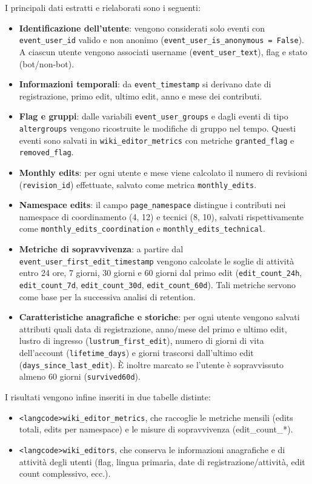 I principali dati estratti e rielaborati sono i seguenti:

\begin{itemize}
  \item \textbf{Identificazione dell’utente}: vengono considerati solo eventi con \texttt{event\_user\_id} valido e non anonimo (\texttt{event\_user\_is\_anonymous = False}). A ciascun utente vengono associati username (\texttt{event\_user\_text}), flag e stato (bot/non-bot).
  \item \textbf{Informazioni temporali}: da \texttt{event\_timestamp} si derivano date di registrazione, primo edit, ultimo edit, anno e mese dei contributi.
  \item \textbf{Flag e gruppi}: dalle variabili \texttt{event\_user\_groups} e dagli eventi di tipo \texttt{altergroups} vengono ricostruite le modifiche di gruppo nel tempo. Questi eventi sono salvati in \texttt{wiki\_editor\_metrics} con metriche \texttt{granted\_flag} e \texttt{removed\_flag}.
  \item \textbf{Monthly edits}: per ogni utente e mese viene calcolato il numero di revisioni (\texttt{revision\_id}) effettuate, salvato come metrica \texttt{monthly\_edits}.
  \item \textbf{Namespace edits}: il campo \texttt{page\_namespace} distingue i contributi nei namespace di coordinamento (4, 12) e tecnici (8, 10), salvati rispettivamente come \texttt{monthly\_edits\_coordination} e \texttt{monthly\_edits\_technical}.
  \item \textbf{Metriche di sopravvivenza}: a partire dal \texttt{event\_user\_first\_edit\_timestamp} vengono calcolate le soglie di attività entro 24 ore, 7 giorni, 30 giorni e 60 giorni dal primo edit (\texttt{edit\_count\_24h}, \texttt{edit\_count\_7d}, \texttt{edit\_count\_30d}, \texttt{edit\_count\_60d}). Tali metriche servono come base per la successiva analisi di retention.
  \item \textbf{Caratteristiche anagrafiche e storiche}: per ogni utente vengono salvati attributi quali data di registrazione, anno/mese del primo e ultimo edit, lustro di ingresso (\texttt{lustrum\_first\_edit}), numero di giorni di vita dell’account (\texttt{lifetime\_days}) e giorni trascorsi dall’ultimo edit (\texttt{days\_since\_last\_edit}). È inoltre marcato se l’utente è sopravvissuto almeno 60 giorni (\texttt{survived60d}).
\end{itemize}

I risultati vengono infine inseriti in due tabelle distinte:
\begin{itemize}
  \item \texttt{<langcode>wiki\_editor\_metrics}, che raccoglie le metriche mensili (edits totali, edits per namespace) e le misure di sopravvivenza (edit\_count\_*). 
  \item \texttt{<langcode>wiki\_editors}, che conserva le informazioni anagrafiche e di attività degli utenti (flag, lingua primaria, date di registrazione/attività, edit count complessivo, ecc.).
\end{itemize}

